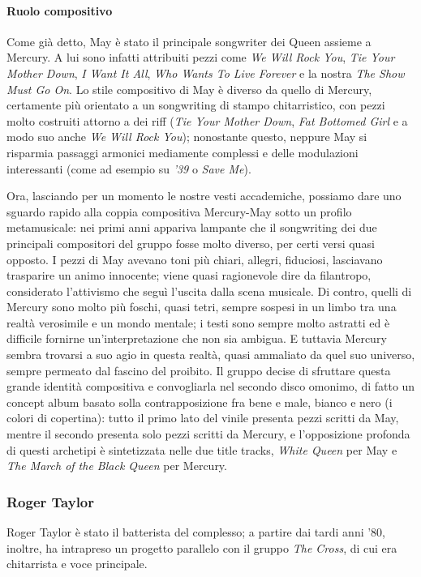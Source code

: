 \documentclass[12pt]{article}
\begin{document}
\paragraph{Ruolo compositivo}\label{par:sngwrmay}
Come già detto, May è stato il principale songwriter dei Queen assieme a Mercury. A lui sono infatti attribuiti pezzi come \emph{We Will Rock You}, \emph{Tie Your Mother Down}, \emph{I Want It All}, \emph{Who Wants To Live Forever} e la nostra \emph{The Show Must Go On}. Lo stile compositivo di May è diverso da quello di Mercury, certamente più orientato a un songwriting di stampo chitarristico, con pezzi molto costruiti attorno a dei riff (\emph{Tie Your Mother Down}, \emph{Fat Bottomed Girl} e a modo suo anche \emph{We Will Rock You}); nonostante questo, neppure May si risparmia passaggi armonici mediamente complessi e delle modulazioni interessanti (come ad esempio su \emph{'39} o \emph{Save Me}).

Ora, lasciando per un momento le nostre vesti accademiche, possiamo dare uno sguardo rapido alla coppia compositiva Mercury-May sotto un profilo metamusicale: nei primi anni appariva lampante che il songwriting dei due principali compositori del gruppo fosse molto diverso, per certi versi quasi opposto. I pezzi di May avevano toni più chiari, allegri, fiduciosi, lasciavano trasparire un animo innocente; viene quasi ragionevole dire da filantropo, considerato l'attivismo che seguì l'uscita dalla scena musicale. Di contro, quelli di Mercury sono molto più foschi, quasi tetri, sempre sospesi in un limbo tra una realtà verosimile e un mondo mentale; i testi sono sempre molto astratti ed è difficile fornirne un'interpretazione che non sia ambigua. E tuttavia Mercury sembra trovarsi a suo agio in questa realtà, quasi ammaliato da quel suo universo, sempre permeato dal fascino del proibito. Il gruppo decise di sfruttare questa grande identità compositiva e convogliarla nel secondo disco omonimo, di fatto un concept album basato solla contrapposizione fra bene e male, bianco e nero (i colori di copertina): tutto il primo lato del vinile presenta pezzi scritti da May, mentre il secondo presenta solo pezzi scritti da Mercury, e l'opposizione profonda di questi archetipi è sintetizzata nelle due title tracks, \emph{White Queen} per May e \emph{The March of the Black Queen} per Mercury.

\subsubsection{Roger Taylor}
Roger Taylor è stato il batterista del complesso; a partire dai tardi anni '80, inoltre, ha intrapreso un progetto parallelo con il gruppo \emph{The Cross}, di cui era chitarrista e voce principale.
\end{document}
